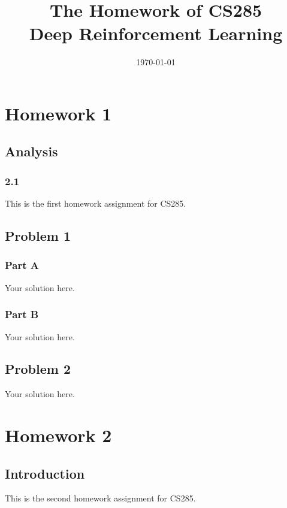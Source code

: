 \documentclass[12pt,oneside]{book}
\title{The Homework of CS285\\
\large Deep Reinforcement Learning}
\author{\Name}
\date{\today}
\begin{document}
\sloppy
\maketitle
{}
\tableofcontents
\setcounter{tocdepth}{2}
\mainmatter
\newpage
{}

\chapter{Homework 1}

\section{Analysis}

\subsection{2.1}

This is the first homework assignment for CS285.

\section{Problem 1}

\subsection{Part A}

Your solution here.

\subsection{Part B}

Your solution here.

\section{Problem 2}

Your solution here.

\chapter{Homework 2}

\section{Introduction}

This is the second homework assignment for CS285.
\end{document}
